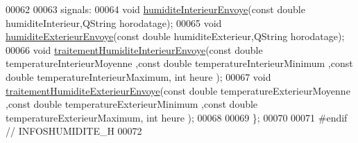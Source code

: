 \begin{DoxyCode}
00062 
00063     signals:
00064         \textcolor{keywordtype}{void} \hyperlink{class_infos_humidite_aa0eb7d8a609b837e1b450b7d79e1ff81}{humiditeInterieurEnvoye}(\textcolor{keyword}{const} \textcolor{keywordtype}{double} humiditeInterieur,QString 
      horodatage); 
00065         \textcolor{keywordtype}{void} \hyperlink{class_infos_humidite_a666d4bd12639460ea0fd2a3f483c2842}{humiditeExterieurEnvoye}(\textcolor{keyword}{const} \textcolor{keywordtype}{double} humiditeExterieur,QString 
      horodatage);
00066         \textcolor{keywordtype}{void} \hyperlink{class_infos_humidite_a3643afa07ff3ac73a4190d77ce230d3b}{traitementHumiditeInterieurEnvoye}(\textcolor{keyword}{const} \textcolor{keywordtype}{double} 
      temperatureInterieurMoyenne ,\textcolor{keyword}{const} \textcolor{keywordtype}{double} temperatureInterieurMinimum ,\textcolor{keyword}{const} \textcolor{keywordtype}{double} temperatureInterieurMaximum, \textcolor{keywordtype}{int} heure
      );
00067         \textcolor{keywordtype}{void} \hyperlink{class_infos_humidite_abd0535dee74a4588232d282d0fe64829}{traitementHumiditeExterieurEnvoye}(\textcolor{keyword}{const} \textcolor{keywordtype}{double} 
      temperatureExterieurMoyenne ,\textcolor{keyword}{const} \textcolor{keywordtype}{double} temperatureExterieurMinimum ,\textcolor{keyword}{const} \textcolor{keywordtype}{double} temperatureExterieurMaximum, \textcolor{keywordtype}{int} heure
      );
00068 
00069 \};
00070 
00071 \textcolor{preprocessor}{#endif // INFOSHUMIDITE\_H}
00072 
\end{DoxyCode}

